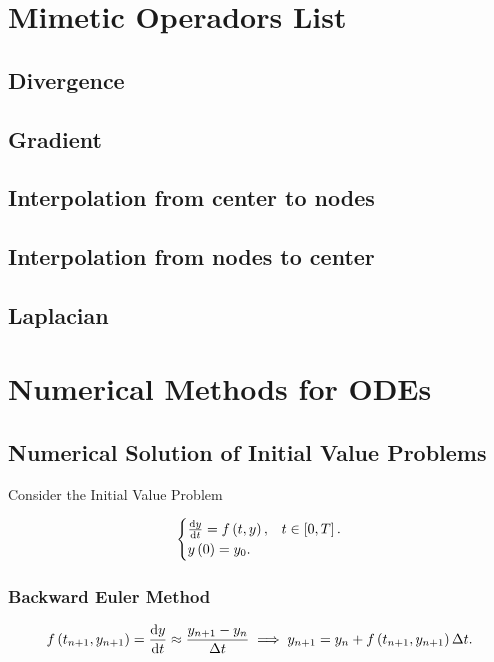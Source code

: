 \chapter{Mimetic Operadors List}

\section{Divergence}

\section{Gradient}

\section{Interpolation from center to nodes}

\section{Interpolation from nodes to center}

\section{Laplacian}

\chapter{Numerical Methods for ODEs}

\section{Numerical Solution of Initial Value Problems}


Consider the Initial Value Problem

\begin{equation*}
	\begin{cases}
		\diff{y}{t}=
		f\left(t,y\right), & t\in\left[0,T\right]. \\
		y\left(0\right)=
		y_{0}.             &
	\end{cases}
\end{equation*}

\subsection{Backward Euler Method}
\begin{equation*}
	f\left(t_{n+1},y_{n+1}\right)
	=\diff{y}{t}\approx
	\frac{y_{n+1}-y_{n}}{\Delta t}\implies
	y_{n+1}=
	y_{n}+
	f\left(t_{n+1},y_{n+1}\right)
	\Delta t.
\end{equation*}

